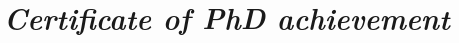 \chapter{\textit{Certificate of PhD achievement}}
{\hypersetup{linkcolor=GREYDARK}\minitoc}
\label{chap:annexe-certificate}





